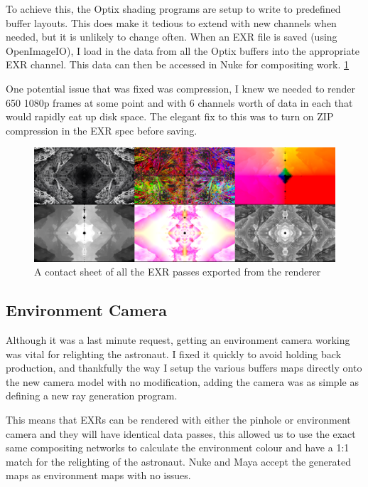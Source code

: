\documentclass[11pt,a4paper,final,notitlepage]{report}
\begin{document}
To achieve this, the Optix shading programs are setup to write to predefined buffer layouts. This does make it tedious to extend with new channels when needed, but it is unlikely to change often. When an EXR file is saved (using OpenImageIO), I load in the data from all the Optix buffers into the appropriate EXR channel. This data can then be accessed in Nuke for compositing work. \ref{fig:exr}

One potential issue that was fixed was compression, I knew we needed to render 650 1080p frames at some point and with 6 channels worth of data in each that would rapidly eat up disk space. The elegant fix to this was to turn on ZIP compression in the EXR spec before saving.

\begin{figure}[h!]
	\includegraphics[width=\textwidth]{images/contactsheet}
	\caption{A contact sheet of all the EXR passes exported from the renderer}
	\label{fig:exr}
\end{figure}


\subsection{Environment Camera}
Although it was a last minute request, getting an environment camera working was vital for relighting the astronaut. I fixed it quickly to avoid holding back production, and thankfully the way I setup the various buffers maps directly onto the new camera model with no modification, adding the camera was as simple as defining a new ray generation program.

This means that EXRs can be rendered with either the pinhole or environment camera and they will have identical data passes, this allowed us to use the exact same compositing networks to calculate the environment colour and have a 1:1 match for the relighting of the astronaut. Nuke and Maya accept the generated maps as environment maps with no issues.
\end{document}
